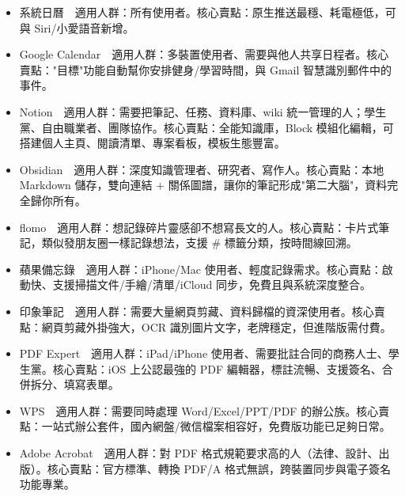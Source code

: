 
\begin{itemize}
  \item 系統日曆　適用人群：所有使用者。核心賣點：原生推送最穩、耗電極低，可與 Siri/小愛語音新增。
  \item Google Calendar　適用人群：多裝置使用者、需要與他人共享日程者。核心賣點："目標"功能自動幫你安排健身/學習時間，與 Gmail 智慧識別郵件中的事件。
\end{itemize}


\begin{itemize}
  \item Notion　適用人群：需要把筆記、任務、資料庫、wiki 統一管理的人；學生黨、自由職業者、團隊協作。核心賣點：全能知識庫，Block 模組化編輯，可搭建個人主頁、閱讀清單、專案看板，模板生態豐富。
  \item Obsidian　適用人群：深度知識管理者、研究者、寫作人。核心賣點：本地 Markdown 儲存，雙向連結 + 關係圖譜，讓你的筆記形成"第二大腦"，資料完全歸你所有。
  \item flomo　適用人群：想記錄碎片靈感卻不想寫長文的人。核心賣點：卡片式筆記，類似發朋友圈一樣記錄想法，支援 \# 標籤分類，按時間線回溯。
  \item 蘋果備忘錄　適用人群：iPhone/Mac 使用者、輕度記錄需求。核心賣點：啟動快、支援掃描文件/手繪/清單/iCloud 同步，免費且與系統深度整合。
  \item 印象筆記　適用人群：需要大量網頁剪藏、資料歸檔的資深使用者。核心賣點：網頁剪藏外掛強大，OCR 識別圖片文字，老牌穩定，但進階版需付費。
\end{itemize}


\begin{itemize}
  \item PDF Expert　適用人群：iPad/iPhone 使用者、需要批註合同的商務人士、學生黨。核心賣點：iOS 上公認最強的 PDF 編輯器，標註流暢、支援簽名、合併拆分、填寫表單。
  \item WPS　適用人群：需要同時處理 Word/Excel/PPT/PDF 的辦公族。核心賣點：一站式辦公套件，國內網盤/微信檔案相容好，免費版功能已足夠日常。
  \item Adobe Acrobat　適用人群：對 PDF 格式規範要求高的人（法律、設計、出版）。核心賣點：官方標準、轉換 PDF/A 格式無誤，跨裝置同步與電子簽名功能專業。
\end{itemize}


